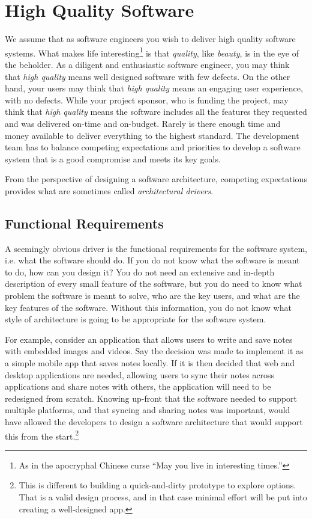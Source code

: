 \section{High Quality Software}
We assume that as software engineers you wish to deliver high quality software systems.
What makes life interesting\footnote{As in the apocryphal Chinese curse ``May you live in interesting times.''}
is that \emph{quality}, like \emph{beauty}, is in the eye of the beholder.
As a diligent and enthusiastic software engineer, you may think that \emph{high quality} means well designed software with few defects.
On the other hand, your users may think that \emph{high quality} means an engaging user experience, with no defects.
While your project sponsor, who is funding the project, may think that \emph{high quality}
means the software includes all the features they requested and was delivered on-time and on-budget.
Rarely is there enough time and money available to deliver everything to the highest standard.
The development team has to balance competing expectations and priorities to develop a software system that is a good compromise and meets its key goals.

From the perspective of designing a software architecture, competing expectations provides what are sometimes called \textit{architectural drivers}.

\subsection{Functional Requirements}
A seemingly obvious driver is the functional requirements for the software system, i.e. what the software should do.
If you do not know what the software is meant to do, how can you design it?
You do not need an extensive and in-depth description of every small feature of the software,
but you do need to know what problem the software is meant to solve, who are the key users,
and what are the key features of the software.
Without this information, you do not know what style of architecture is going to be appropriate for the software system.

For example, consider an application that allows users to write and save notes with embedded images and videos.
Say the decision was made to implement it as a simple mobile app that saves notes locally.
If it is then decided that web and desktop applications are needed, allowing users to sync their notes across applications and share notes with others,
the application will need to be redesigned from scratch.
Knowing up-front that the software needed to support multiple platforms, and that syncing and sharing notes was important, 
would have allowed the developers to design a software architecture that would support this from the start.\footnote{This is different to building a quick-and-dirty prototype
to explore options. That is a valid design process, and in that case minimal effort will be put into creating a well-designed app.}

